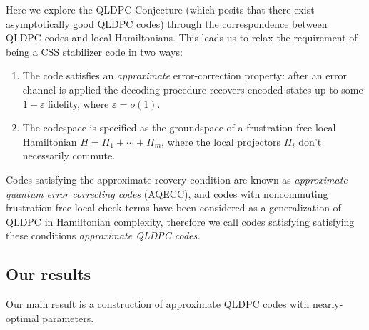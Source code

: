 \documentclass[11pt,letterpaper]{article}
\theoremstyle{definition}
\theoremstyle{remark}
\numberwithin{equation}{section}
\theoremstyle{definition}
\begin{document}
Here we explore the QLDPC Conjecture (which posits that there exist asymptotically good QLDPC codes) through the correspondence between QLDPC codes and local Hamiltonians.  This leads us to relax the requirement of being a CSS stabilizer code in two ways:
\begin{enumerate}
  \item The code satisfies an \emph{approximate} error-correction property: after an error channel is applied the decoding procedure recovers encoded states up to some $1 - \varepsilon$ fidelity, where $\varepsilon = o(1)$.
  
  \item The codespace is specified as the groundspace of a frustration-free local Hamiltonian $H = \Pi_1 + \cdots + \Pi_m$, where the local projectors $\Pi_i$ don't necessarily commute. 
\end{enumerate}
Codes satisfying the approximate reovery condition are known as \emph{approximate quantum error correcting codes} (AQECC), and codes with noncommuting frustration-free local check terms have been considered as a generalization of QLDPC in Hamiltonian complexity, therefore we call codes satisfying satisfying these conditions \emph{approximate QLDPC codes.}%

\subsection{Our results}

Our main result is a construction of approximate QLDPC codes with nearly-optimal parameters. 
\end{document}
